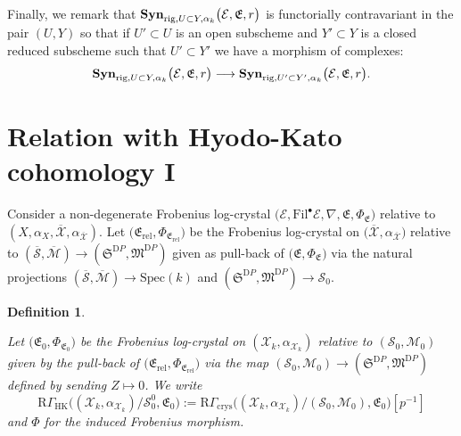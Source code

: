 \documentclass[asterisque,english]{smfart}
\newtheorem{definition}{Definition}[]
\begin{document}
Finally, we remark that  $\mathbf{Syn}_{{\rm rig},U\subset Y, \alpha_k}\bigl(\mathcal{E},\mathfrak{E},r\bigr)$ is functorially contravariant in the pair $(U,Y)$ so that if $U'\subset U$ is an open subscheme and $Y'\subset Y$ is a closed reduced subscheme such that $U'\subset Y'$ we have a morphism of complexes: 
$$\mathbf{Syn}_{{\rm rig},U\subset Y, \alpha_k}\bigl(\mathcal{E},\mathfrak{E},r\bigr)\longrightarrow \mathbf{Syn}_{{\rm rig},U'\subset Y', \alpha_k}\bigl(\mathcal{E},\mathfrak{E},r\bigr).$$







\section{Relation with Hyodo-Kato cohomology I}\label{sec:HK}

Consider a non-degenerate  Frobenius log-crystal $ \bigl(\mathcal{E},\mathrm{Fil}^\bullet \mathcal{E}, \nabla,\mathfrak{E},\Phi_{\mathfrak{E}}\bigr)$ relative to $(X,\alpha_X,\overline{\mathcal{X}},\alpha_{\overline{\mathcal{X}}})$.  Let $\bigl(\mathfrak{E}_{\mathrm{rel}},\Phi_{\mathfrak{E}_{\mathrm{rel}}}\bigr)$ be the Frobenius log-crystal on $\bigl(\overline{\mathcal{X}},\alpha_{\overline{\mathcal{X}}}\bigr)$ relative to  $(\overline{\mathcal{S}},\overline{\mathcal{M}}) \to (\mathfrak{S}^{\mathrm DP}, \mathfrak{M}^{\mathrm DP})$ given as pull-back of $\bigl(\mathfrak{E},\Phi_{\mathfrak{E}}\bigr)$ via the natural projections $(\overline{\mathcal{S}},\overline{\mathcal{M}})\to \mathrm{Spec}(k)$ and  $(\mathfrak{S}^{\mathrm DP}, \mathfrak{M}^{\mathrm DP})\to \mathcal{S}_0$.



\begin{definition}\label{def:HK}



Let  $\bigl(\mathfrak{E}_0,\Phi_{\mathfrak{E}_0}\bigr)$ be the Frobenius log-crystal on $(\mathcal{X}_k,\alpha_{\mathcal{X}_k})$ relative to $ (\mathcal{S}_0,\mathcal{M}_0)$ given by the pull-back of $\bigl(\mathfrak{E}_{\mathrm{rel}},\Phi_{\mathfrak{E}_{\mathrm{rel}}}\bigr)$ via the map  $(\mathcal{S}_0,\mathcal{M}_0) \to (\mathfrak{S}^{\mathrm DP}, \mathfrak{M}^{\mathrm DP})$ defined by sending $Z\mapsto 0$. We write $$\mathrm{R}\Gamma_{\mathrm{HK}}\bigl((\mathcal{X}_k,\alpha_{\mathcal{X}_k})/ \mathcal{S}_0^0,\mathfrak{E}_0\bigr):=\mathrm{R}\Gamma_{\mathrm{crys}}\bigl((\mathcal{X}_k,\alpha_{\mathcal{X}_k})/(\mathcal{S}_0,\mathcal{M}_0),\mathfrak{E}_0\bigr)[p^{-1}] $$and $\Phi$ for the induced Frobenius morphism.

\end{definition}
\end{document}
